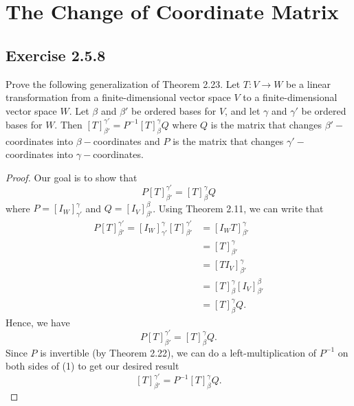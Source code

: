 \section{The Change of Coordinate Matrix}

\subsection*{Exercise 2.5.8} Prove the following generalization of Theorem 2.23. Let \( T : V \to W  \) be a linear transformation from a finite-dimensional vector space \( V  \) to a finite-dimensional vector space \( W  \). Let \( \beta  \) and \( \beta'  \) be ordered bases for \( V  \), and let \( \gamma  \) and \( \gamma'  \) be ordered bases for \( W  \). Then \(  [T]_{\beta'}^{\gamma'} = P^{-1} [T]_{\beta}^{\gamma} Q  \) where \( Q  \) is the matrix that changes \( \beta'- \)coordinates into \( \beta- \)coordinates and \( P  \) is the matrix that changes \( \gamma'-  \)coordinates into \( \gamma- \)coordinates. 
\begin{proof}
Our goal is to show that 
\[  P [T]_{\beta'}^{\gamma'} = [T]_{\beta}^{\gamma} Q \tag{1} \]
where \( P = [{I}_{W}]_{\gamma'}^{\gamma}  \) and \( Q = [{I}_{V}]_{\beta'}^{\beta}  \). Using Theorem 2.11, we can write that
\begin{align*}
    P [T]_{\beta'}^{\gamma'} = [{I}_{W}]_{\gamma'}^{\gamma} [T]_{\beta'}^{\gamma'}  &= [{I}_{W} T]_{\beta'}^{\gamma}  \\
                             &= [T]_{\beta'}^{\gamma}  \\
                             &= [T {I}_{V}]_{\beta'}^{\gamma}  \\
                             &= [T]_{\beta}^{\gamma} [{I}_{V}]_{\beta'}^{\beta} \\
                             &= [T]_{\beta}^{\gamma} Q.
\end{align*}
Hence, we have
\[  P [T]_{\beta'}^{\gamma'} = [T]_{\beta}^{\gamma} Q. \]
Since \( P  \) is invertible (by Theorem 2.22), we can do a left-multiplication of \( P^{-1} \) on both sides of (1) to get our desired result
\[  [T]_{\beta'}^{\gamma'} = P^{-1} [T]_{\beta}^{\gamma} Q. \]
\end{proof}

